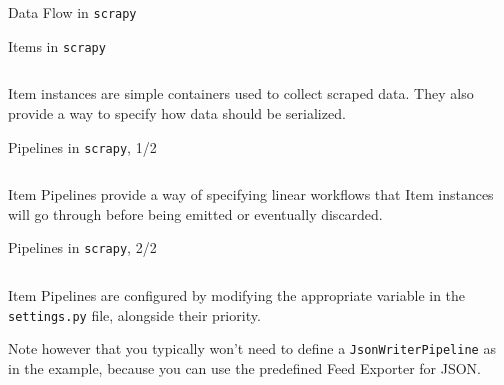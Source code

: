 \documentclass[12pt]{beamer}
\begin{document}
  \begin{frame}{Data Flow in \texttt{scrapy}}
    \begin{figure}
      \centering
    \end{figure}
  \end{frame}

  \begin{frame}{Items in \texttt{scrapy}}
    \inputminted[fontsize=\scriptsize]{python}{tex/src/productitem.py}

    \vspace{0.5cm}

    Item instances are simple containers used to collect scraped data.
    They also provide a way to specify how data should be serialized.
  \end{frame}

  \begin{frame}{Pipelines in \texttt{scrapy}, 1/2}
    \inputminted[fontsize=\scriptsize]{python}{tex/src/pricepipeline.py}

    \vspace{0.5cm}

    Item Pipelines provide a way of specifying linear workflows that Item
    instances will go through before being emitted or eventually discarded.
  \end{frame}

  \begin{frame}{Pipelines in \texttt{scrapy}, 2/2}
    \inputminted[fontsize=\scriptsize]{python}{tex/src/itempipelines.py}

    \vspace{0.5cm}

    Item Pipelines are configured by modifying the appropriate variable
    in the \texttt{settings.py} file, alongside their priority.

    \vspace{0.5cm}

    Note however that you typically won't need to define a
    \texttt{JsonWriterPipeline} as in the example, because you can use the
    predefined Feed Exporter for JSON.
  \end{frame}
\end{document}
